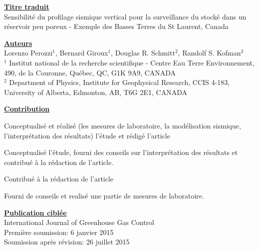 {\setlength{\parindent}{0cm}
\underline{\textbf{Titre traduit}}\\
Sensibilité du profilage sismique vertical pour la surveillance du  
stocké dans un réservoir peu poreux - Exemple des Basses Terres du St Laurent,
Canada

\underline{\textbf{Auteurs}}\\
Lorenzo Perozzi$^1$, Bernard Giroux$^1$, Douglas R. Schmitt$^2$, Randolf S.
Kofman$^2$\\
$^1$ Institut national de la recherche scientifique - Centre Eau Terre
Environnement, 490, de la Couronne, Qu\'ebec, QC, G1K 9A9, CANADA\\
$^2$ Department of Physics, Institute for Geophysical Research, CCIS 4-183,
University of Alberta, Edmonton, AB, T6G 2E1, CANADA

\newpage
\underline{\textbf{Contribution}}
{
\begin{description}[leftmargin=!,labelwidth=\widthof{\bfseries Randolf S.
Kofman}]
  \setlength\itemsep{0.7em}
  \item[Lorenzo Perozzi] Conceptualisé et réalisé (les mesures de laboratoire,
la modélisation sismique, l’interprétation des résultats) l’étude et rédigé
l’article
  \item[Bernard Giroux]  Conceptualisé l'étude, fourni des conseils sur
l’interprétation des résultats et contribué à la rédaction de l’article.
  \item[Douglas R. Schmitt]  Contribué à la rédaction de l’article
  \item[Randolf S. Kofman]  Fourni de conseils et realisé une partie de mesures
de laboratoire.\\
\end{description}
}


\underline{\textbf{Publication ciblée}}\\
{
International Journal of Greenhouse Gas Control\\
Première soumission: 6 janvier 2015\\
Soumission après révision: 26 juillet 2015
}


}
